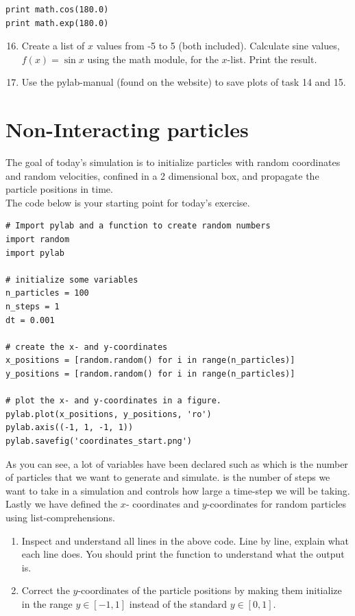 \documentclass{article}
\begin{document}
\begin{lstlisting}
print math.cos(180.0)
print math.exp(180.0)
\end{lstlisting}

\begin{enumerate}
  \setcounter{enumi}{15}
  \item Create a list of $x$ values from -5 to 5 (both included).
    Calculate sine values, $f(x) = \sin{x}$ using the math module,
    for the $x$-list.
    Print the result.
  \item Use the pylab-manual (found on the website) to save plots of 
    task 14 and 15.
\end{enumerate}


\newpage
\section{Non-Interacting particles}

The goal of today's simulation is to initialize particles with random
coordinates and random velocities, confined in a 2 dimensional box,
and propagate the particle positions in time.\\

The code below is your starting point for today's exercise.

\begin{lstlisting}
# Import pylab and a function to create random numbers
import random
import pylab

# initialize some variables
n_particles = 100
n_steps = 1
dt = 0.001

# create the x- and y-coordinates
x_positions = [random.random() for i in range(n_particles)]
y_positions = [random.random() for i in range(n_particles)]

# plot the x- and y-coordinates in a figure.
pylab.plot(x_positions, y_positions, 'ro')
pylab.axis((-1, 1, -1, 1))
pylab.savefig('coordinates_start.png')

\end{lstlisting}

As you can see, a lot of variables have been declared such as
 which
is the number of particles that we want to generate and simulate.
 is
the number of steps we want to take in a simulation
and  controls how large a time-step we will be taking.
Lastly we have defined the
$x$- coordinates and
$y$-coordinates for
 random particles using list-comprehensions.

\begin{enumerate}
  \item Inspect and understand all lines in the above code.
    Line by line, explain what each line does.
    You should print the  function
    to understand what the output is.

  \item Correct the $y$-coordinates of the particle positions by making them
    initialize in the range $y \in [-1,1]$ instead of the standard $y \in [0,1]$.
\end{enumerate}
\end{document}

